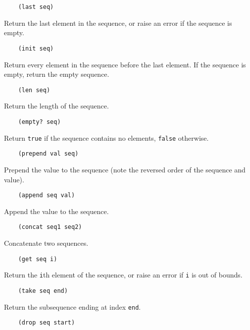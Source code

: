 \documentclass{article}
\newcommand{\inlinecode}{\texttt}
\begin{document}
\begin{verbatim}
    (last seq)
\end{verbatim}

Return the last element in the sequence, or raise an error if the sequence is empty.

\begin{verbatim}
    (init seq)
\end{verbatim}

Return every element in the sequence before the last element. If the sequence is empty, return the empty sequence.

\begin{verbatim}
    (len seq)
\end{verbatim}

Return the length of the sequence.

\begin{verbatim}
    (empty? seq)
\end{verbatim}

Return \inlinecode{true} if the sequence contains no elements, \inlinecode{false} otherwise.

\begin{verbatim}
    (prepend val seq)
\end{verbatim}

Prepend the value to the sequence (note the reversed order of the sequence and value).

\begin{verbatim}
    (append seq val)
\end{verbatim}

Append the value to the sequence.

\begin{verbatim}
    (concat seq1 seq2)
\end{verbatim}

Concatenate two sequences.

\begin{verbatim}
    (get seq i)
\end{verbatim}

Return the \inlinecode{i}th element of the sequence, or raise an error if \inlinecode{i} is out of bounds.

\begin{verbatim}
    (take seq end)
\end{verbatim}

Return the subsequence ending at index \inlinecode{end}.

\begin{verbatim}
    (drop seq start)
\end{verbatim}
\end{document}
